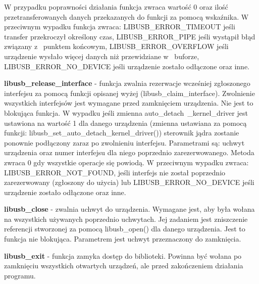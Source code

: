 \documentclass{BscUS}
\begin{document}
\begin{itemize}
{W przypadku poprawności działania funkcja zwraca wartość 0 oraz ilość przetransferowanych danych przekazanych do funkcji za pomocą wskaźnika.
W przeciwnym wypadku funkcja zwraca: LIBUSB\_ERROR\_TIMEOUT jeśli transfer przekroczył określony czas, LIBUSB\_ERROR\_PIPE jeśli wystąpił błąd związany z~ punktem końcowym, LIBUSB\_ERROR\_OVERFLOW jeśli urządzenie wysłało więcej danych niż przewidziane w~ buforze, LIBUSB\_ERROR\_NO\_DEVICE jeśli urządzenie zostało odłączone oraz inne.
\item \textbf{libusb\_release\_interface} - funkcja zwalnia rezerwacje wcześniej zgłoszonego interfejsu za pomocą funkcji opisanej wyżej (libusb\_claim\_interface).
Zwolnienie wszystkich interfejsów jest wymagane przed zamknięciem urządzenia.
Nie jest to blokująca funkcja.
W wypadku jeśli zmienna auto\_detach\ \newline \_kernel\_driver jest ustawiona na wartość 1 dla danego urządzenia (zmienna ustawiana za pomocą funkcji: libusb\_set\_auto\_detach\_kernel\_driver()) sterownik jądra zostanie ponownie podłączony zaraz po zwolnieniu interfejsu.
Parametrami są: uchwyt urządzenia oraz numer interfejsu dla niego poprzednio zarezerwowanego.
\newline
Metoda zwraca 0 gdy wszystkie operacje się powiodą.
W przeciwnym wypadku zwraca: LIBUSB\_ERROR\_NOT\_FOUND, jeśli interfejs nie został poprzednio zarezerwowany (zgłoszony do użycia) lub LIBUSB\_ERROR\_NO\_DEVICE jeśli urządzenie zostało odłączone oraz inne.
\item \textbf{libusb\_close} - zwalnia uchwyt do urządzenia.
Wymagane jest, aby była wołana na wszystkich używanych poprzednio uchwytach.
Jej zadaniem jest zniszczenie referencji stworzonej za pomocą libusb\_open() dla danego urządzenia.
Jest to funkcja nie blokująca.
Parametrem jest uchwyt przeznaczony do zamknięcia.
\item \textbf{libusb\_exit} - funkcja zamyka dostęp do biblioteki.
Powinna być wołana po zamknięciu wszystkich otwartych urządzeń, ale przed zakończeniem działania programu.
}
\end{itemize}
\end{document}
